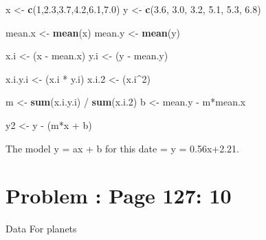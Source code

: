 \documentclass[]{article}
\newenvironment{Shaded}{\begin{snugshade}}{\end{snugshade}}
\newcommand{\KeywordTok}[1]{\textcolor[rgb]{0.13,0.29,0.53}{\textbf{{#1}}}}
\newcommand{\DecValTok}[1]{\textcolor[rgb]{0.00,0.00,0.81}{{#1}}}
\newcommand{\FloatTok}[1]{\textcolor[rgb]{0.00,0.00,0.81}{{#1}}}
\newcommand{\StringTok}[1]{\textcolor[rgb]{0.31,0.60,0.02}{{#1}}}
\newcommand{\NormalTok}[1]{{#1}}
\begin{document}
\begin{Shaded}
\begin{Highlighting}[]
\NormalTok{x <-}\StringTok{ }\KeywordTok{c}\NormalTok{(}\DecValTok{1}\NormalTok{,}\FloatTok{2.3}\NormalTok{,}\FloatTok{3.7}\NormalTok{,}\FloatTok{4.2}\NormalTok{,}\FloatTok{6.1}\NormalTok{,}\FloatTok{7.0}\NormalTok{)}
\NormalTok{y <-}\StringTok{ }\KeywordTok{c}\NormalTok{(}\FloatTok{3.6}\NormalTok{, }\FloatTok{3.0}\NormalTok{, }\FloatTok{3.2}\NormalTok{, }\FloatTok{5.1}\NormalTok{, }\FloatTok{5.3}\NormalTok{, }\FloatTok{6.8}\NormalTok{)}

\NormalTok{mean.x <-}\StringTok{ }\KeywordTok{mean}\NormalTok{(x)}
\NormalTok{mean.y <-}\StringTok{ }\KeywordTok{mean}\NormalTok{(y)}

\NormalTok{x.i <-}\StringTok{ }\NormalTok{(x -}\StringTok{ }\NormalTok{mean.x)}
\NormalTok{y.i <-}\StringTok{ }\NormalTok{(y -}\StringTok{ }\NormalTok{mean.y)}

\NormalTok{x.i.y.i <-}\StringTok{ }\NormalTok{(x.i *}\StringTok{ }\NormalTok{y.i)}
\NormalTok{x.i}\FloatTok{.2}   \NormalTok{<-}\StringTok{ }\NormalTok{(x.i^}\DecValTok{2}\NormalTok{)}

\NormalTok{m <-}\StringTok{ }\KeywordTok{sum}\NormalTok{(x.i.y.i) /}\StringTok{ }\KeywordTok{sum}\NormalTok{(x.i}\FloatTok{.2}\NormalTok{)}
\NormalTok{b <-}\StringTok{ }\NormalTok{mean.y -}\StringTok{ }\NormalTok{m*mean.x}

\NormalTok{y2 <-}\StringTok{ }\NormalTok{y -}\StringTok{ }\NormalTok{(m*x +}\StringTok{ }\NormalTok{b)}
\end{Highlighting}
\end{Shaded}

The model y = ax + b for this date = y = 0.56x+2.21.

\section{Problem : Page 127: 10}\label{problem-page-127-10}

Data For planets
\end{document}
